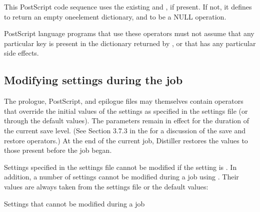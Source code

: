 \documentclass[letterpaper,12pt,english,openany,oneside]{sphinxmanual}
\begin{document}
This PostScript code sequence uses the existing  and  , if present. If not, it defines  to return an empty one\sphinxhyphen{}element dictionary, and  to be a NULL operation.

PostScript language programs that use these operators must not assume that any particular key is present in the dictionary returned by  , or that  has any particular side effects.




\subsection{Modifying settings during the job}
\label{\detokenize{index:modifying-settings-during-the-job}}
The prologue, PostScript, and epilogue files may themselves contain  operators that override the initial values of the settings as specified in the settings file (or through the default values). The parameters remain in effect for the duration of the current save level. (See Section 3.7.3 in the  for a discussion of the save and restore operators.) At the end of the current job, Distiller restores the values to those present before the job began.

Settings specified in the settings file cannot be modified if the  setting is  . In addition, a number of settings cannot be modified during a job using  . Their values are always taken from the settings file or the default values:

Settings that cannot be modified during a job
\end{document}
